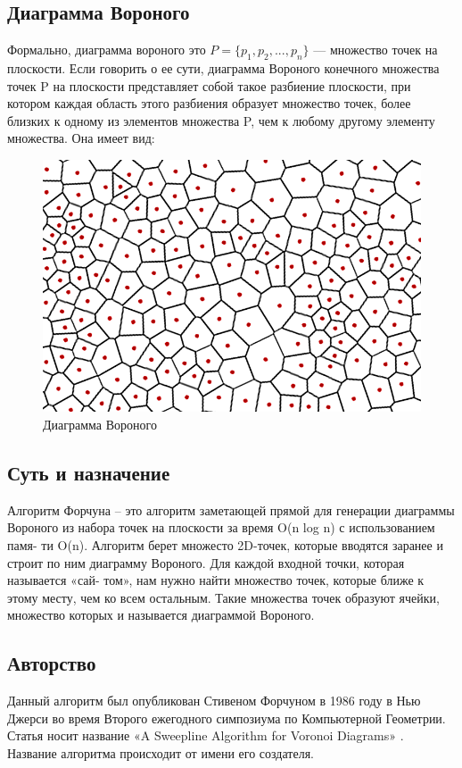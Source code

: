 \documentclass[ a4paper]{article}
\begin{document}
\subsection{Диаграмма Вороного}
Формально, диаграмма вороного это $P = \lbrace p_1,p_2,...,p_n \rbrace $ — множество точек на плоскости.
Если говорить о ее сути, диаграмма Вороного конечного множества точек P на плоскости представляет собой такое разбиение плоскости, при котором каждая область этого разбиения образует множество точек, более близких к одному из элементов множества P, чем к любому другому элементу множества. 
Она имеет вид:\\
\begin{figure}[H]
\centering
\includegraphics[scale = 0.4]{voronoi}
\caption{\label{tab:widgets}Диаграмма Вороного}
\end{figure}

\subsection{Суть и назначение}
Алгоритм Форчуна – это алгоритм заметающей прямой для генерации диаграммы
Вороного из набора точек на плоскости за время O(n log n) с использованием памя-
ти O(n). Алгоритм берет множесто 2D-точек, которые вводятся заранее и строит по
ним диаграмму Вороного. Для каждой входной точки, которая называется «сай-
том», нам нужно найти множество точек, которые ближе к этому месту, чем ко
всем остальным. Такие множества точек образуют ячейки, множество которых и
называется диаграммой Вороного.

\subsection{Авторство}
Данный алгоритм был опубликован Стивеном Форчуном в 1986 году в Нью Джерси во время Второго ежегодного симпозиума по Компьютерной Геометрии. Статья носит название «A Sweepline Algorithm for Voronoi Diagrams» . Название алгоритма происходит от имени его создателя.
\end{document}
